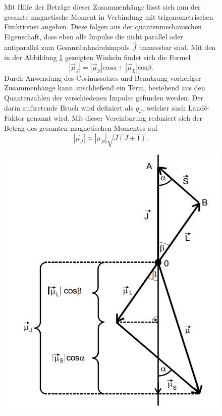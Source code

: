 \begin{figure}
\begin{minipage}[b]{0.5\textwidth}
Mit Hilfe der Beträge dieser Zusammenhänge lässt sich nun der gesamte magnetische Moment in Verbindung mit trigonometrischen Funktionen angeben.
Diese folgen aus der quantenmechanischen Eigenschaft, dass eben alle Impulse die nicht parallel oder antiparallel zum Gesamtbahndrehimpuls $\vec{J}$
unmessbar sind. Mit den in der Abbildung \ref{fig:winkel} gezeigten Winkeln findet sich die Formel
\begin{equation*}
    |\vec{\mu}_J| =  |\vec{\mu}_S|\text{cos}\alpha + |\vec{\mu}_L| \text{cos}\beta.
\end{equation*}
Durch Anwendung des Cosinussatzes und Benutzung vorheriger Zusammenhänge kann anschließend ein Term, bestehend aus den Quantenzahlen
der verschiedenen Impulse gefunden werden. Der darin auftretende Bruch wird definiert als $g_J$, welcher auch Landé-Faktor genannt wird.
Mit dieser Vereinbarung reduziert sich der Betrag des gesamten magnetischen Momentes auf
\begin{equation}
    \label{eqn:idkobdasüberhaubtsstimmtlol}
    |\vec{\mu}_J| \approx |\mu_B| \sqrt{J(J+1)}.
\end{equation}
\end{minipage}
\hfill
\begin{minipage}[b]{0.45\textwidth}
    \centering
    \includegraphics[width=\textwidth]{bilder/winkel.png}
    \captionsetup{justification=centering}
    \label{fig:winkel}
\end{minipage}
\end{figure}
